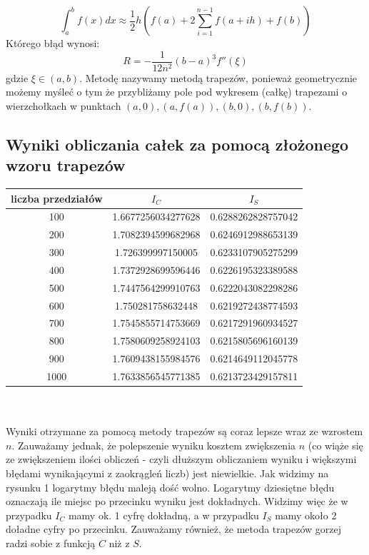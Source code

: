 \documentclass{article}
\begin{document}
\begin{equation}
\int_a^b f(x) dx \approx \frac{1}{2} h (f(a) + 2\sum_{i=1} ^{n-1} f(a+ih) +f(b))
\end{equation}
Którego błąd wynosi:
\begin{equation}
R = -\frac{1}{12n^2}(b-a)^3f''(\xi)
\end{equation}
gdzie $\xi \in (a, b)$.
Metodę nazywamy metodą trapezów, ponieważ geometrycznie możemy myśleć o tym że przybliżamy pole pod wykresem (całkę) trapezami o wierzchołkach w punktach $ (a, 0), (a, f(a)), (b, 0), (b, f(b)) $.
\subsection*{Wyniki obliczania całek za pomocą złożonego wzoru trapezów}
\begin{tabular}{|c|c|c|} \hline
liczba przedziałów & $I_C$ & $I_S$ \\ \hline \hline
100 & 1.6677256034277628 & 0.6288262828757042 \\ \hline
200 & 1.7082394599682968 & 0.6246912988653139 \\ \hline
300 & 1.726399997150005  & 0.6233107905275299 \\ \hline
400 & 1.7372928699596446 & 0.6226195323389588 \\ \hline
500 & 1.7447564299910763 & 0.6222043082298286 \\ \hline
600 & 1.750281758632448  & 0.6219272438774593 \\ \hline
700 & 1.7545855714753669 & 0.6217291960934527 \\ \hline
800 & 1.7580609258924103 & 0.6215805696160139 \\ \hline
900 & 1.7609438155984576 & 0.6214649112045778 \\ \hline
1000& 1.7633856545771385 & 0.6213723429157811 \\ \hline
\end{tabular}\\
\\
Wyniki otrzymane za pomocą metody trapezów są coraz lepsze wraz ze wzrostem $n$. Zauważamy jednak, że polepszenie wyniku kosztem zwiększenia $n$ (co wiąże się ze zwiększeniem ilości obliczeń - czyli dłuższym obliczaniem wyniku i większymi błędami wynikającymi z zaokrągleń liczb) jest niewielkie. Jak widzimy na rysunku 1 %
logarytmy błędu maleją dość wolno. Logarytmy dziesiętne błędu oznaczają ile miejsc po przecinku wyniku jest dokładnych. Widzimy więc że w przypadku $I_C$ mamy ok. 1 cyfrę dokładną, a w przypadku $I_S$ mamy około 2 doładne cyfry po przecinku. Zauważamy również, że metoda trapezów gorzej radzi sobie z funkcją $C$ niż z $S$.
\end{document}
